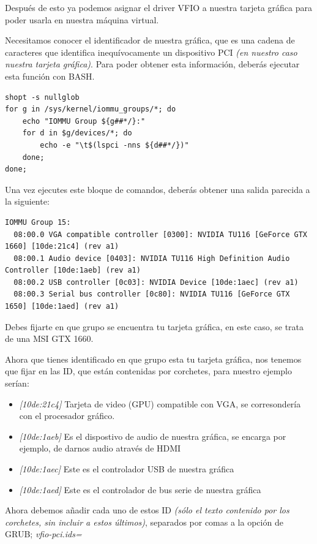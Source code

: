 \documentclass[12pt]{article}
\begin{document}
Después de esto ya podemos asignar el driver VFIO a nuestra tarjeta gráfica para poder usarla en nuestra máquina virtual.

Necesitamos conocer el identificador de nuestra gráfica, que es una cadena de caracteres que identifica inequívocamente un dispositivo PCI \emph{(en nuestro caso nuestra tarjeta gráfica)}. Para poder obtener esta información, deberás ejecutar esta función con BASH.

\begin{verbatim}
shopt -s nullglob
for g in /sys/kernel/iommu_groups/*; do
    echo "IOMMU Group ${g##*/}:"
    for d in $g/devices/*; do
        echo -e "\t$(lspci -nns ${d##*/})"
    done;
done;
\end{verbatim}

Una vez ejecutes este bloque de comandos, deberás obtener una salida parecida a la siguiente:

\begin{lstlisting}[basicstyle=\scriptsize\ttfamily]
IOMMU Group 15:
  08:00.0 VGA compatible controller [0300]: NVIDIA TU116 [GeForce GTX 1660] [10de:21c4] (rev a1)
  08:00.1 Audio device [0403]: NVIDIA TU116 High Definition Audio Controller [10de:1aeb] (rev a1)
  08:00.2 USB controller [0c03]: NVIDIA Device [10de:1aec] (rev a1)
  08:00.3 Serial bus controller [0c80]: NVIDIA TU116 [GeForce GTX 1650] [10de:1aed] (rev a1)
\end{lstlisting}

Debes fijarte en que grupo se encuentra tu tarjeta gráfica, en este caso, se trata de una MSI GTX 1660.

Ahora que tienes identificado en que grupo esta tu tarjeta gráfica, nos tenemos que fijar en las ID, que están contenidas por corchetes, para nuestro ejemplo serían:

\begin{itemize}
	\setlength\itemsep{-0.2em}
	\item \emph{[10de:21c4]} Tarjeta de video (GPU) compatible con VGA, se corresondería con el procesador gráfico.
	\item \emph{[10de:1aeb]} Es el dispostivo de audio de nuestra gráfica, se encarga por ejemplo, de darnos audio através de HDMI
	\item \emph{[10de:1aec]} Este es el controlador USB de nuestra gráfica
	\item \emph{[10de:1aed]} Este es el controlador de bus serie de nuestra gráfica
\end{itemize}

Ahora debemos añadir cada uno de estos ID \emph{(sólo el texto contenido por los corchetes, sin incluir a estos últimos)}, separados por comas a la opción de GRUB; \emph{vfio-pci.ids=}
\end{document}
